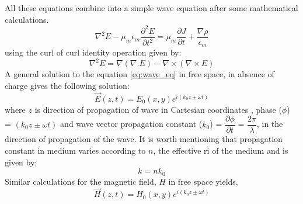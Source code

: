 \documentclass[../report.tex]{subfiles}
\begin{document}
All these equations combine into a simple wave equation after some mathematical calculations.
\begin{equation}\label{eq:wave_eq}
\nabla^2 E -  \mu_m\epsilon_m\frac{\partial^2 E}{\partial t^2} = \mu_m\frac{\partial J}{\partial t} + \frac{\nabla\rho}{\epsilon_m}	
\end{equation}
using the curl of curl identity operation given by: 
\begin{equation}\label{eq:curl_of_curl}
\nabla^2 E = \nabla(\nabla.E) - \nabla\times(\nabla\times E)
\end{equation}
A general solution to the equation \ref{eq:wave_eq} in free space, in absence of charge gives the following solution:
\begin{equation}\label{eq:wave_sol_electric}
\overrightarrow{E}(z,t)=E_{0}(x,y)e^{i\left(k_{0}z\pm \omega t\right)}
\end{equation}
where $z$ is direction of propagation of wave in Cartesian coordinates , phase ($\phi$) = $\left(k_{0}z\pm \omega t\right)$ and wave vector propagation constant ($k_0$) = $\dfrac {\partial \phi } {\partial t}$ = $\dfrac {2\pi } {\lambda }$, in the direction of propagation of the wave. It is worth mentioning that propagation constant in medium varies according to $n$, the effective \gls{ri} of the medium and is given by: 
\begin{equation}\label{eq:ri_med_val}
k = nk_0
\end{equation}
Similar calculations for the magnetic field, $H$ in free space yields, 		
\begin{equation}\label{eq:wave_sol_magnetic}
\overrightarrow{H}(z,t)=H_{0}(x,y)e^{i\left(k_{0}z\pm \omega t\right)}
\end{equation}
\end{document}
